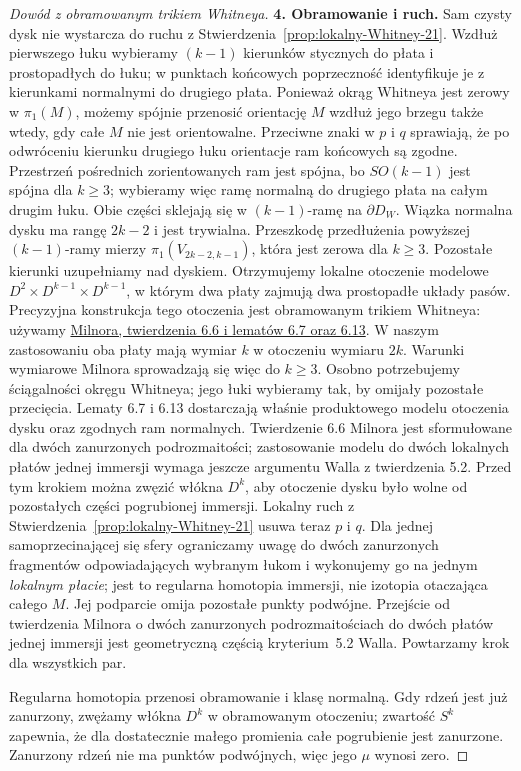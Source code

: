 \begin{proof}[Dowód z obramowanym trikiem Whitneya]
\textbf{4. Obramowanie i ruch.}
Sam czysty dysk nie wystarcza do ruchu z
Stwierdzenia~\ref{prop:lokalny-Whitney-21}.
Wzdłuż pierwszego łuku wybieramy $(k-1)$ kierunków
stycznych do płata i prostopadłych do łuku;
w punktach końcowych poprzeczność identyfikuje
je z kierunkami normalnymi do drugiego płata.
Ponieważ okrąg Whitneya jest zerowy w $\pi_1(M)$,
możemy spójnie przenosić orientację $M$ wzdłuż
jego brzegu także wtedy, gdy całe $M$ nie jest
orientowalne. Przeciwne znaki w $p$ i $q$ sprawiają,
że po odwróceniu kierunku drugiego łuku orientacje
ram końcowych są zgodne. Przestrzeń pośrednich
zorientowanych ram jest spójna, bo $SO(k-1)$
jest spójna dla $k\geq3$; wybieramy więc ramę
normalną do drugiego płata na całym drugim łuku.
Obie części sklejają się w $(k-1)$-ramę na
$\partial D_W$. Wiązka normalna
dysku ma rangę $2k-2$ i jest trywialna. Przeszkodę
przedłużenia powyższej $(k-1)$-ramy mierzy
$\pi_1(V_{2k-2,k-1})$, która jest zerowa dla
$k\geq3$. Pozostałe kierunki uzupełniamy nad
dyskiem. Otrzymujemy lokalne otoczenie modelowe
$D^2\times D^{k-1}\times D^{k-1}$, w którym
dwa płaty zajmują dwa prostopadłe układy pasów.
Precyzyjna konstrukcja tego otoczenia jest
obramowanym trikiem Whitneya: używamy
\href{https://webhomes.maths.ed.ac.uk/~v1ranick/surgery/hcobord.pdf}
{Milnora, twierdzenia 6.6 i lematów 6.7 oraz 6.13}.
W naszym zastosowaniu oba płaty mają wymiar $k$
w otoczeniu wymiaru $2k$. Warunki wymiarowe
Milnora sprowadzają się więc do $k\geq3$.
Osobno potrzebujemy ściągalności okręgu Whitneya;
jego łuki wybieramy tak, by omijały pozostałe
przecięcia. Lematy 6.7
i 6.13 dostarczają właśnie produktowego modelu
otoczenia dysku oraz zgodnych ram normalnych.
Twierdzenie 6.6 Milnora jest sformułowane dla
dwóch zanurzonych podrozmaitości; zastosowanie
modelu do dwóch lokalnych płatów jednej immersji
wymaga jeszcze argumentu Walla z twierdzenia 5.2.
Przed tym krokiem można zwęzić włókna $D^k$,
aby otoczenie dysku było wolne od pozostałych
części pogrubionej immersji.
Lokalny ruch z
Stwierdzenia~\ref{prop:lokalny-Whitney-21}
usuwa teraz $p$ i $q$. Dla jednej samoprzecinającej
się sfery ograniczamy uwagę do dwóch zanurzonych
fragmentów odpowiadających wybranym łukom
i wykonujemy go na jednym \emph{lokalnym płacie};
jest to regularna homotopia
immersji, nie izotopia otaczająca całego $M$.
Jej podparcie omija pozostałe punkty podwójne.
Przejście od twierdzenia Milnora o dwóch zanurzonych
podrozmaitościach do dwóch płatów jednej immersji
jest geometryczną częścią kryterium~5.2 Walla.
Powtarzamy krok dla wszystkich par.

Regularna homotopia przenosi obramowanie i klasę
normalną. Gdy rdzeń jest już zanurzony, zwężamy
włókna $D^k$ w obramowanym otoczeniu; zwartość
$S^k$ zapewnia, że dla dostatecznie małego promienia
całe pogrubienie jest zanurzone. Zanurzony rdzeń
nie ma punktów podwójnych, więc jego $\mu$ wynosi
zero.
\end{proof}

